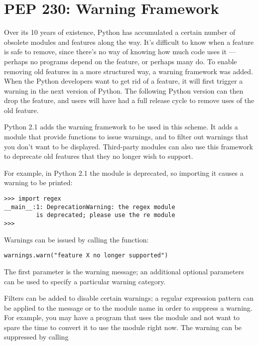 \documentclass{howto}
\begin{document}
\section{PEP 230: Warning Framework}

Over its 10 years of existence, Python has accumulated a certain
number of obsolete modules and features along the way.  It's difficult
to know when a feature is safe to remove, since there's no way of
knowing how much code uses it --- perhaps no programs depend on the
feature, or perhaps many do.  To enable removing old features in a
more structured way, a warning framework was added.  When the Python
developers want to get rid of a feature, it will first trigger a
warning in the next version of Python.  The following Python version
can then drop the feature, and users will have had a full release
cycle to remove uses of the old feature.

Python 2.1 adds the warning framework to be used in this scheme.  It
adds a  module that provide functions to issue
warnings, and to filter out warnings that you don't want to be
displayed. Third-party modules can also use this framework to
deprecate old features that they no longer wish to support.

For example, in Python 2.1 the  module is deprecated, so
importing it causes a warning to be printed:

\begin{verbatim}
>>> import regex
__main__:1: DeprecationWarning: the regex module
         is deprecated; please use the re module
>>>
\end{verbatim}

Warnings can be issued by calling the 
function:

\begin{verbatim}
warnings.warn("feature X no longer supported")
\end{verbatim}

The first parameter is the warning message; an additional optional
parameters can be used to specify a particular warning category.

Filters can be added to disable certain warnings; a regular expression
pattern can be applied to the message or to the module name in order
to suppress a warning.  For example, you may have a program that uses
the  module and not want to spare the time to convert it
to use the  module right now.  The warning can be
suppressed by calling
\end{document}
